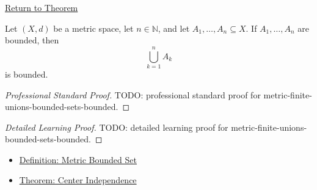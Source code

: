 \newpage
{}
\label{prf:metric-finite-unions-bounded-sets-bounded}

\begin{remark*}[Return]
\hyperref[thm:metric-finite-unions-bounded-sets-bounded]{Return to Theorem}
\end{remark*}

\begin{theorem*}
Let \((X,d)\) be a metric space, let \(n\in\mathbb{N}\), and let
\(A_1,\ldots,A_n\subseteq X\).  If \(A_1,\ldots,A_n\) are bounded, then
\[
  \bigcup_{k=1}^n A_k
\]
is bounded.
\end{theorem*}

\begin{proof}[Professional Standard Proof]
\LRAProofBodyStart
TODO: professional standard proof for metric-finite-unions-bounded-sets-bounded.
\end{proof}

\begin{proof}[Detailed Learning Proof]
\LRAProofBodyStart
TODO: detailed learning proof for metric-finite-unions-bounded-sets-bounded.
\end{proof}

\begin{remark*}
\end{remark*}

\begin{dependencies}
\begin{itemize}
  \item \hyperref[def:metric-bounded-set]{Definition: Metric Bounded Set}
  \item \hyperref[thm:metric-bounded-center-independence]{Theorem: Center Independence}
\end{itemize}
\end{dependencies}

\clearpage
